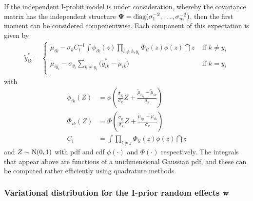 If the independent I-probit model is under consideration, whereby the covariance matrix has the independent structure ${\bm\Psi} = \operatorname{diag}(\sigma_1^{-2},\dots,\sigma_m^{-2})$, then the first moment  can be considered componentwise. 
Each component of this expectation is given by
\begin{align}\label{eq:ystarupdate}
  \tilde y_{ik}^* =
  \begin{cases}
    \tilde\mu_{ik} - \sigma_k C_i^{-1} \displaystyle{  \int \phi_{ik}(z) \prod_{l \neq k,y_i} \Phi_{il}(z) \phi(z) \dint z }
    &\text{ if } k \neq y_i \\[1.5em]
    \tilde\mu_{iy_i} - \sigma_{y_i} \sum_{k \neq y_i} \big(\tilde y_{ik}^* -  \tilde\mu_{ik} \big) 
    &\text{ if } k = y_i \\
  \end{cases}
\end{align}
with 
\vspace{-1em}
\begin{align*}
  \phi_{ik}(Z) &= \phi \left(\frac{\sigma_{y_i}}{\sigma_k} Z + \frac{\tilde\mu_{iy_i} - \tilde\mu_{ik}}{\sigma_k} \right) \\
  \Phi_{ik}(Z) &= \Phi \left(\frac{\sigma_{y_i}}{\sigma_k} Z + \frac{\tilde\mu_{iy_i} - \tilde\mu_{ik}}{\sigma_k} \right) \\
  C_i &= \int \prod_{l \neq j} \Phi_{il}(z) \phi(z) \dint z
\end{align*}
and $Z \sim \operatorname{N}(0,1)$ with pdf and cdf $\phi(\cdot)$ and $\Phi(\cdot)$ respectively. 
The integrals that appear above are functions of a unidimensional Gaussian pdf, and these can be computed rather efficiently using quadrature methods.
\vspace{-0.3em}

\subsubsection{Variational distribution for the I-prior random effects \texorpdfstring{${\mathbf w}$}{$w$}}

